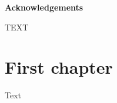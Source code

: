 \documentclass[a4paper,twoside,openright,12pt]{report}
\makeatletter
\newcommand\ackname{Acknowledgements}
\newenvironment{acknowledgements}{%
      \titlepage
      \null\vfil
      \@beginparpenalty\@lowpenalty
      \begin{center}%
        \bfseries \ackname
        \@endparpenalty\@M
      \end{center}}%
     {\par\vfil\null\endtitlepage}
\newenvironment{acknowledgements}{%
      \if@twocolumn
        \section*{\abstractname}%
      \else
        \small
        \begin{center}%
          {\bfseries \ackname\vspace{-.5em}\vspace{\z@}}%
        \end{center}%
        \quotation
      \fi}
      {\if@twocolumn\else\endquotation\fi}
\makeatother
\begin{document}
\tableofcontents

\begin{acknowledgements}
\noindent
TEXT
\end{acknowledgements}

\cleardoublepage

\pagestyle{plain}
\newpage
\setcounter{page}{1}

\chapter{First chapter}
Text
\end{document}
